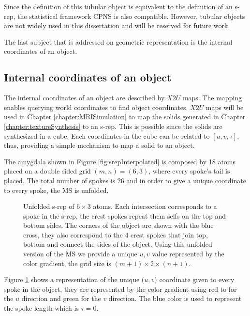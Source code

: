 Since the definition of this tubular object is equivalent to 
the definition of an s-rep, 
the statistical framework CPNS 
is also compatible. 
However, tubular objects are not widely used in this dissertation and
will be reserved for future work. 

The last subject that is addressed on geometric representation
is the internal coordinates of an object.

\subsection{Internal coordinates of an object}
\label{sec:internalCoordinates}

The internal coordinates of an object are described by $X2U$ maps. 
The mapping enables querying world coordinates to find object coordinates.
$X2U$ maps will be used in Chapter \ref{chapter:MRISimulation}
to map the solids generated in Chapter \ref{chapter:textureSynthesis} 
to an s-rep. This is possible since the solids are synthesized 
in a cube. Each coordinates in the cube can be related to $[u, v, \tau]$, thus, providing 
a simple mechanism to map a solid to an object. 

The amygdala shown in Figure \ref{fig:srepInterpolated} 
is composed by 18 atoms placed on a double sided grid $(m, n) = (6, 3)$, where every spoke's tail is placed.
The total number of spokes is 26 and
in order to give
a unique coordinate to every spoke, 
the MS is unfolded. 

\begin{figure} 
 \centering  
 \caption[Unfolding the s-rep.]{Unfolded s-rep of $6 \times 3$ atoms. Each intersection corresponds to a spoke in the s-rep,  
          the crest spokes repeat them selfs on the top and bottom sides. 
          The corners of the object are shown with the blue cross, 
          they also correspond to the 4 crest spokes that join top, bottom and connect the sides
          of the object. 
          Using this unfolded version of the MS we provide a unique $u, v$ value represented by the color gradient,
          the grid size is $(m + 1) \times 2\times(n + 1)$.
          }
 \label{fig:unfoldedSlab}  
\end{figure}

Figure \ref{fig:unfoldedSlab} shows a representation 
of the unique $(u, v$) coordinate given to 
every spoke in the object, they are represented by the color gradient
using red to for the $u$ direction and green for the $v$ direction. 
The blue color is used to represent the spoke length which is $\tau = 0$.

